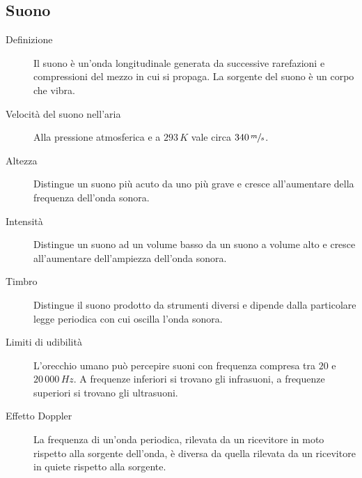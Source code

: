 \documentclass[a4paper,11pt,italian]{article}
\begin{document}
\subsection{Suono}

\begin{description}
  \item[Definizione] 
  Il suono è un'onda longitudinale generata da successive rarefazioni e compressioni del mezzo in cui si propaga.
  La sorgente del suono è un corpo che vibra.

  \item[Velocità del suono nell'aria] 
  Alla pressione atmosferica e a $ 293 \, K $ vale circa $ 340 \, \sfrac{m}{s} $.

  \item[Altezza] 
  Distingue un suono più acuto da uno più grave e cresce all'aumentare della frequenza dell'onda sonora.

  \item[Intensità]
  Distingue un suono ad un volume basso da un suono a volume alto e cresce all'aumentare dell'ampiezza dell'onda sonora.

  \item[Timbro] 
  Distingue il suono prodotto da strumenti diversi e dipende dalla particolare legge periodica con cui oscilla l'onda sonora.

  \item[Limiti di udibilità] 
  L'orecchio umano può percepire suoni con frequenza compresa tra $ 20 $ e $ 20\, 000 \, Hz $. A frequenze inferiori si trovano gli infrasuoni, a frequenze superiori si trovano gli ultrasuoni.

%   

  \item[Effetto Doppler] 
  La frequenza di un'onda periodica, rilevata da un ricevitore in moto rispetto alla sorgente dell'onda, è diversa da quella rilevata da un ricevitore in quiete rispetto alla sorgente.
  

\end{description}
\end{document}
